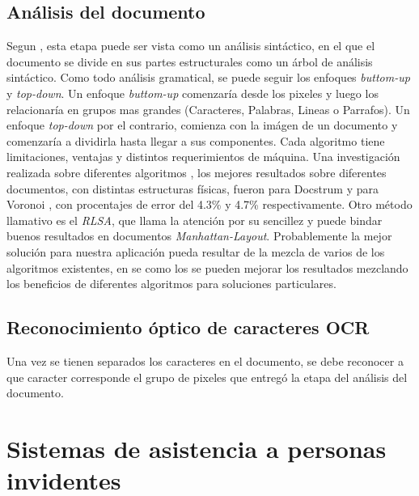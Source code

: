 \documentclass{article}
\begin{document}
	\subsection{Análisis del documento}
	Segun \cite{doc_analysis2}, esta etapa puede ser vista como un análisis sintáctico,
	en el que el documento se divide en sus partes estructurales como un árbol de análisis
	sintáctico. Como todo análisis gramatical, se puede seguir los enfoques
	\textit{buttom-up} y \textit{top-down}. Un enfoque \textit{buttom-up} comenzaría desde
	los pixeles y luego los relacionaría en grupos mas grandes (Caracteres, Palabras, Lineas
	o Parrafos). Un enfoque \textit{top-down} por el contrario, comienza con la imágen de un
	documento y comenzaría a dividirla hasta llegar a sus componentes.
	Cada algoritmo tiene limitaciones, ventajas y distintos requerimientos de máquina.
	Una investigación realizada sobre diferentes algoritmos \cite{benchmark1}, los
	mejores resultados sobre diferentes documentos, con distintas estructuras físicas,
	fueron para Docstrum \cite{docstrum93} y para Voronoi \cite{voronoi1}, con procentajes
	de error del 4.3\% y 4.7\% respectivamente. Otro método
	llamativo es el \textit{RLSA}, que llama la atención por su sencillez y puede bindar
	buenos resultados en documentos \textit{Manhattan-Layout}\cite{RLSA1}.
	Probablemente la mejor solución para nuestra aplicación pueda resultar de la mezcla de
	varios de los algoritmos existentes, en \cite{voronoi2} se como los se pueden mejorar
	los resultados mezclando los beneficios de diferentes algoritmos para soluciones
	particulares.
	
	\subsection{Reconocimiento óptico de caracteres OCR}
	Una vez se tienen separados los caracteres en el documento, se debe reconocer a que
	caracter corresponde el grupo de pixeles que entregó la etapa del análisis del
	documento.
	
	\section{Sistemas de asistencia a personas invidentes}
	


\end{document}
